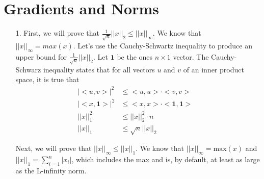 \documentclass[10pt,a4paper]{article}
\begin{document}
\section{Gradients and Norms}
\begin{itemize}
  \item[1.] First, we will prove that $\frac{1}{\sqrt{n}}||x||_{2} \leq ||x||_\infty$. We know that $||x||_{\infty} = max(x)$. Let's use the Cauchy-Schwartz inequality to produce an upper bound for $\frac{1}{\sqrt{n}}||x||_{2}$. Let $\mathbf{1}$ be the ones $n \times 1$ vector. The Cauchy-Schwarz inequality states that for all vectors $u$ and $v$ of an inner product space, it is true that
  \begin{align*}
    |<u, v>|^{2} &\leq <u,u> \cdot <v,v>& \\
    |<x, \mathbf{1}>|^2 &\leq <x, x> \cdot <\mathbf{1}, \mathbf{1}>& \\
    ||x||_{1}^{2} &\leq ||x||_{2}^{2} \cdot n& \\
    ||x||_{1} &\leq \sqrt{n}||x||_{2}&
  \end{align*}

  Next, we will prove that $||x||_{\infty} \leq ||x||_{1}$. We know that $||x||_{\infty} = \text{max}(x)$ and $||x||_{1} = \sum_{i=1}^{n}|x_i|$, which includes the max and is, by default, at least as large as the L-infinity norm.
\end{itemize}
\end{document}
